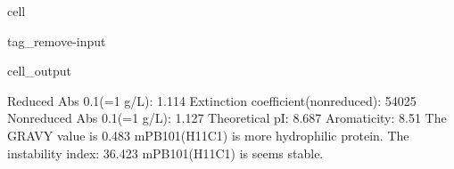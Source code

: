 \documentclass[letterpaper,10pt,english]{jupyterBook}
\begin{document}
\begin{sphinxuseclass}{cell}
\begin{sphinxuseclass}{tag_remove-input}
\begin{sphinxVerbatimOutput}
\begin{sphinxuseclass}{cell_output}
\begin{sphinxVerbatim}[commandchars=\\\{\}]
\PYGZsh{} Reduced Abs 0.1\PYGZpc{}(=1 g/L): \PYGZhy{}\PYGZhy{}\PYGZhy{}\PYGZhy{}\PYGZhy{}\PYGZhy{}\PYGZhy{}\PYGZhy{}\PYGZhy{}\PYGZhy{}\PYGZhy{}\PYGZhy{}\PYGZhy{}\PYGZhy{}\PYGZhy{}\PYGZhy{}\PYGZhy{}\PYGZhy{}\PYGZhy{}\PYGZhy{}\PYGZhy{}\PYGZhy{}\PYGZhy{}\PYGZhy{}\PYGZhy{}\PYGZhy{}\PYGZhy{}\PYGZhy{}\PYGZhy{}\PYGZhy{}\PYGZhy{}\PYGZhy{}\PYGZhy{}1.114
\PYGZsh{} Extinction coefficient(non\PYGZhy{}reduced): \PYGZhy{}\PYGZhy{}\PYGZhy{}\PYGZhy{}\PYGZhy{}\PYGZhy{}\PYGZhy{}\PYGZhy{}\PYGZhy{}\PYGZhy{}\PYGZhy{}\PYGZhy{}\PYGZhy{}\PYGZhy{}\PYGZhy{}\PYGZhy{}\PYGZhy{}\PYGZhy{}\PYGZhy{}\PYGZhy{}\PYGZhy{}\PYGZhy{}54025
\PYGZsh{} Non\PYGZhy{}reduced Abs 0.1\PYGZpc{}(=1 g/L): \PYGZhy{}\PYGZhy{}\PYGZhy{}\PYGZhy{}\PYGZhy{}\PYGZhy{}\PYGZhy{}\PYGZhy{}\PYGZhy{}\PYGZhy{}\PYGZhy{}\PYGZhy{}\PYGZhy{}\PYGZhy{}\PYGZhy{}\PYGZhy{}\PYGZhy{}\PYGZhy{}\PYGZhy{}\PYGZhy{}\PYGZhy{}\PYGZhy{}\PYGZhy{}\PYGZhy{}\PYGZhy{}\PYGZhy{}\PYGZhy{}\PYGZhy{}\PYGZhy{}1.127
\PYGZsh{} Theoretical pI: \PYGZhy{}\PYGZhy{}\PYGZhy{}\PYGZhy{}\PYGZhy{}\PYGZhy{}\PYGZhy{}\PYGZhy{}\PYGZhy{}\PYGZhy{}\PYGZhy{}\PYGZhy{}\PYGZhy{}\PYGZhy{}\PYGZhy{}\PYGZhy{}\PYGZhy{}\PYGZhy{}\PYGZhy{}\PYGZhy{}\PYGZhy{}\PYGZhy{}\PYGZhy{}\PYGZhy{}\PYGZhy{}\PYGZhy{}\PYGZhy{}\PYGZhy{}\PYGZhy{}\PYGZhy{}\PYGZhy{}\PYGZhy{}\PYGZhy{}\PYGZhy{}\PYGZhy{}\PYGZhy{}\PYGZhy{}\PYGZhy{}\PYGZhy{}\PYGZhy{}\PYGZhy{}\PYGZhy{}\PYGZhy{}8.687
\PYGZsh{} Aromaticity: \PYGZhy{}\PYGZhy{}\PYGZhy{}\PYGZhy{}\PYGZhy{}\PYGZhy{}\PYGZhy{}\PYGZhy{}\PYGZhy{}\PYGZhy{}\PYGZhy{}\PYGZhy{}\PYGZhy{}\PYGZhy{}\PYGZhy{}\PYGZhy{}\PYGZhy{}\PYGZhy{}\PYGZhy{}\PYGZhy{}\PYGZhy{}\PYGZhy{}\PYGZhy{}\PYGZhy{}\PYGZhy{}\PYGZhy{}\PYGZhy{}\PYGZhy{}\PYGZhy{}\PYGZhy{}\PYGZhy{}\PYGZhy{}\PYGZhy{}\PYGZhy{}\PYGZhy{}\PYGZhy{}\PYGZhy{}\PYGZhy{}\PYGZhy{}\PYGZhy{}\PYGZhy{}\PYGZhy{}\PYGZhy{}\PYGZhy{}\PYGZhy{}\PYGZhy{}8.51\PYGZpc{}
\PYGZsh{} The GRAVY value is \PYGZhy{}\PYGZhy{}\PYGZhy{}\PYGZhy{}\PYGZhy{}\PYGZhy{}\PYGZhy{}\PYGZhy{}\PYGZhy{}\PYGZhy{}\PYGZhy{}\PYGZhy{}\PYGZhy{}\PYGZhy{}\PYGZhy{}\PYGZhy{}\PYGZhy{}\PYGZhy{}\PYGZhy{}\PYGZhy{}\PYGZhy{}\PYGZhy{}\PYGZhy{}\PYGZhy{}\PYGZhy{}\PYGZhy{}\PYGZhy{}\PYGZhy{}\PYGZhy{}\PYGZhy{}\PYGZhy{}\PYGZhy{}\PYGZhy{}\PYGZhy{}\PYGZhy{}\PYGZhy{}\PYGZhy{}\PYGZhy{}\PYGZhy{}\PYGZhy{}0.483
  mPB101(H\PYGZus{}11C1) is more hydrophilic protein.
\PYGZsh{} The instability index: \PYGZhy{}\PYGZhy{}\PYGZhy{}\PYGZhy{}\PYGZhy{}\PYGZhy{}\PYGZhy{}\PYGZhy{}\PYGZhy{}\PYGZhy{}\PYGZhy{}\PYGZhy{}\PYGZhy{}\PYGZhy{}\PYGZhy{}\PYGZhy{}\PYGZhy{}\PYGZhy{}\PYGZhy{}\PYGZhy{}\PYGZhy{}\PYGZhy{}\PYGZhy{}\PYGZhy{}\PYGZhy{}\PYGZhy{}\PYGZhy{}\PYGZhy{}\PYGZhy{}\PYGZhy{}\PYGZhy{}\PYGZhy{}\PYGZhy{}\PYGZhy{}\PYGZhy{}36.423
  mPB101(H\PYGZus{}11C1) is seems stable.
\end{sphinxVerbatim}

\end{sphinxuseclass}\end{sphinxVerbatimOutput}

\end{sphinxuseclass}
\end{sphinxuseclass}
\end{document}
